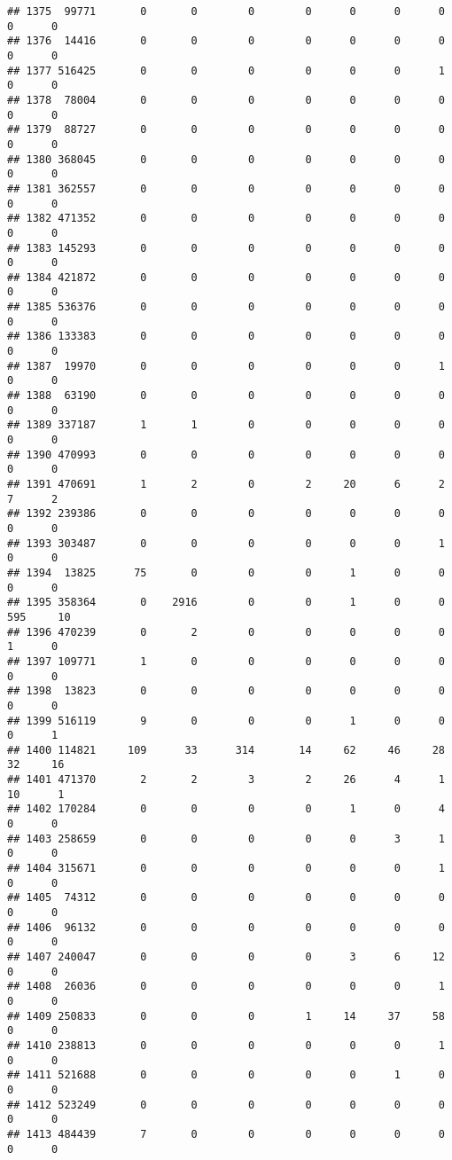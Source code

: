 \documentclass[
]{article}
\begin{document}
\begin{verbatim}
## 1375  99771       0       0        0        0      0      0      0     0      0
## 1376  14416       0       0        0        0      0      0      0     0      0
## 1377 516425       0       0        0        0      0      0      1     0      0
## 1378  78004       0       0        0        0      0      0      0     0      0
## 1379  88727       0       0        0        0      0      0      0     0      0
## 1380 368045       0       0        0        0      0      0      0     0      0
## 1381 362557       0       0        0        0      0      0      0     0      0
## 1382 471352       0       0        0        0      0      0      0     0      0
## 1383 145293       0       0        0        0      0      0      0     0      0
## 1384 421872       0       0        0        0      0      0      0     0      0
## 1385 536376       0       0        0        0      0      0      0     0      0
## 1386 133383       0       0        0        0      0      0      0     0      0
## 1387  19970       0       0        0        0      0      0      1     0      0
## 1388  63190       0       0        0        0      0      0      0     0      0
## 1389 337187       1       1        0        0      0      0      0     0      0
## 1390 470993       0       0        0        0      0      0      0     0      0
## 1391 470691       1       2        0        2     20      6      2     7      2
## 1392 239386       0       0        0        0      0      0      0     0      0
## 1393 303487       0       0        0        0      0      0      1     0      0
## 1394  13825      75       0        0        0      1      0      0     0      0
## 1395 358364       0    2916        0        0      1      0      0   595     10
## 1396 470239       0       2        0        0      0      0      0     1      0
## 1397 109771       1       0        0        0      0      0      0     0      0
## 1398  13823       0       0        0        0      0      0      0     0      0
## 1399 516119       9       0        0        0      1      0      0     0      1
## 1400 114821     109      33      314       14     62     46     28    32     16
## 1401 471370       2       2        3        2     26      4      1    10      1
## 1402 170284       0       0        0        0      1      0      4     0      0
## 1403 258659       0       0        0        0      0      3      1     0      0
## 1404 315671       0       0        0        0      0      0      1     0      0
## 1405  74312       0       0        0        0      0      0      0     0      0
## 1406  96132       0       0        0        0      0      0      0     0      0
## 1407 240047       0       0        0        0      3      6     12     0      0
## 1408  26036       0       0        0        0      0      0      1     0      0
## 1409 250833       0       0        0        1     14     37     58     0      0
## 1410 238813       0       0        0        0      0      0      1     0      0
## 1411 521688       0       0        0        0      0      1      0     0      0
## 1412 523249       0       0        0        0      0      0      0     0      0
## 1413 484439       7       0        0        0      0      0      0     0      0
\end{verbatim}
\end{document}
